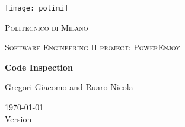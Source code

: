 \centering
\texttt{[image: polimi]}\\\vspace{0.25cm}
{\scshape\LARGE Politecnico di Milano\par}\vspace{0.25cm}
{\scshape\Large Software Engineering II project: PowerEnjoy\par}\vspace{1.5cm}
{\huge\bfseries Code Inspection \par}\vspace{1cm}
{\large Gregori Giacomo and Ruaro Nicola\par}\vfill

{\large \today \\Version \version}
